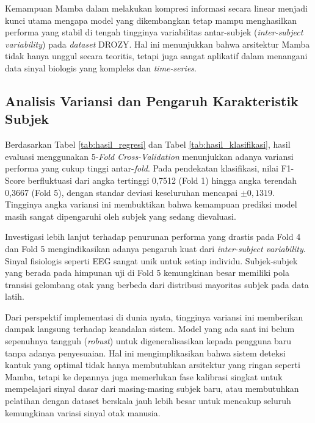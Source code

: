 Kemampuan Mamba dalam melakukan kompresi informasi secara linear menjadi kunci utama mengapa model yang dikembangkan tetap mampu menghasilkan performa yang stabil di tengah tingginya variabilitas antar-subjek (\textit{inter-subject variability}) pada \textit{dataset} DROZY. Hal ini menunjukkan bahwa arsitektur Mamba tidak hanya unggul secara teoritis, tetapi juga sangat aplikatif dalam menangani data sinyal biologis yang kompleks dan \textit{time-series}.

\subsection{Analisis Variansi dan Pengaruh Karakteristik Subjek}
\label{subsec:analisis_variansi}

Berdasarkan Tabel \ref{tab:hasil_regresi} dan Tabel \ref{tab:hasil_klasifikasi}, hasil evaluasi menggunakan 5-\textit{Fold Cross-Validation} menunjukkan adanya variansi performa yang cukup tinggi antar-\textit{fold}. Pada pendekatan klasifikasi, nilai F1-Score berfluktuasi dari angka tertinggi 0,7512 (Fold 1) hingga angka terendah 0,3667 (Fold 5), dengan standar deviasi keseluruhan mencapai $\pm 0,1319$. Tingginya angka variansi ini membuktikan bahwa kemampuan prediksi model masih sangat dipengaruhi oleh subjek yang sedang dievaluasi. 

Investigasi lebih lanjut terhadap penurunan performa yang drastis pada Fold 4 dan Fold 5 mengindikasikan adanya pengaruh kuat dari \textit{inter-subject variability}. Sinyal fisiologis seperti EEG sangat unik untuk setiap individu. Subjek-subjek yang berada pada himpunan uji di Fold 5 kemungkinan besar memiliki pola transisi gelombang otak yang berbeda dari distribusi mayoritas subjek pada data latih.

Dari perspektif implementasi di dunia nyata, tingginya variansi ini memberikan dampak langsung terhadap keandalan sistem. Model yang ada saat ini belum sepenuhnya tangguh (\textit{robust}) untuk digeneralisasikan kepada pengguna baru tanpa adanya penyesuaian. Hal ini mengimplikasikan bahwa sistem deteksi kantuk yang optimal tidak hanya membutuhkan arsitektur yang ringan seperti Mamba, tetapi ke depannya juga memerlukan fase kalibrasi singkat untuk mempelajari sinyal dasar dari masing-masing subjek baru, atau membutuhkan pelatihan dengan dataset berskala jauh lebih besar untuk mencakup seluruh kemungkinan variasi sinyal otak manusia.